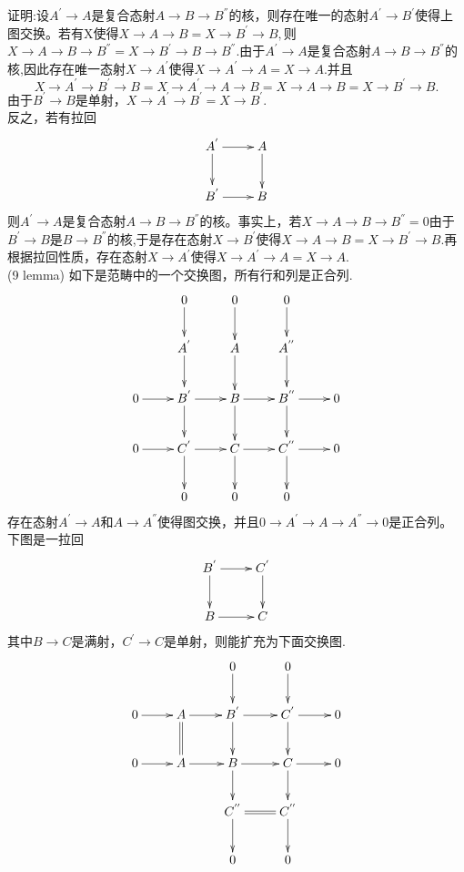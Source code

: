 \documentclass[UTF8]{article}
\begin{document}
证明:设$A^{'}\longrightarrow A$是复合态射$A\longrightarrow B\longrightarrow B^{''}$的核，则存在唯一的态射$A^{'}\longrightarrow B^{'}$使得上图交换。若有X使得$X\longrightarrow A\longrightarrow B=X\longrightarrow B^{'}\longrightarrow B,$则$X\longrightarrow A\longrightarrow B\longrightarrow B^{''}=X\longrightarrow B^{'}\longrightarrow B\longrightarrow B^{''}.$由于$A^{'}\longrightarrow A$是复合态射$A\longrightarrow B\longrightarrow B^{''}$的核,因此存在唯一态射$X\longrightarrow A^{'}$使得$X\longrightarrow A^{'}\longrightarrow A=X\longrightarrow A.$并且
$$X\longrightarrow A^{'}\longrightarrow B^{'}\longrightarrow B=X\longrightarrow A^{'}\longrightarrow A\longrightarrow B=X\longrightarrow A\longrightarrow B=X\longrightarrow B^{'}\longrightarrow B.$$
由于$B^{'}\rightarrow B$是单射，$X\rightarrow A^{'}\rightarrow B^{'}=X\rightarrow B^{'}.$\\
反之，若有拉回
$$
\xymatrix{
	A^{'}\ar[r]\ar[d]&A\ar[d]\\
	B^{'}\ar[r]&B
}
$$
则$A^{'}\longrightarrow A$是复合态射$A\longrightarrow B\longrightarrow B^{''}$的核。事实上，若$X\rightarrow A\longrightarrow B\longrightarrow B^{''}=0$由于$B^{'}\rightarrow B$是$B\rightarrow B^{''}$的核,于是存在态射$X\rightarrow B^{'}$使得$X\rightarrow A\rightarrow B=X\rightarrow B^{'}\rightarrow B.$再根据拉回性质，存在态射$X\rightarrow A^{'}$使得$X\rightarrow A^{'}\rightarrow A=X\rightarrow A.$\\
(9 lemma)
如下是范畴中的一个交换图，所有行和列是正合列.
$$
\xymatrix{
	&0\ar[d]&0\ar[d]&0\ar[d]\\
	&A^{'}\ar[d]&A\ar[d]&A^{''}\ar[d]\\
0\ar[r]&	B^{'}\ar[r]\ar[d]&B\ar[r]\ar[d]&B^{''}\ar[r]\ar[d]&0\\
0\ar[r]&	C^{'}\ar[r]\ar[d]&C\ar[r]\ar[d]&C^{''}\ar[r]\ar[d]&0\\
&0&0&0&\\
}
$$
存在态射$A^{'}\rightarrow A$和$A\rightarrow A^{''}$使得图交换，并且$
0\rightarrow A^{'}\rightarrow A\rightarrow A^{''}\rightarrow 0$是正合列。\\
下图是一拉回$$
\xymatrix{
	B^{'}\ar[r]\ar[d]&C^{'}\ar[d]\\
	B\ar[r]&C
}
$$
其中$B\rightarrow C$是满射，$C^{'}\rightarrow C$是单射，则能扩充为下面交换图.\\
$$
\xymatrix{
	&&0\ar[d]&0\ar[d]\\
0\ar[r]	&A\ar@{=}[d]\ar[r]&B^{'}\ar[d]\ar[r]&C^{'}\ar[d]\ar[r]&0\\
	0\ar[r]&A\ar[r]&B\ar[r]\ar[d]&C\ar[r]\ar[d]&0\\
&&C^{''}\ar@{=}[r]\ar[d]&C^{''}\ar[d]&\\
	&&0&0&\\
}
$$
\end{document}
